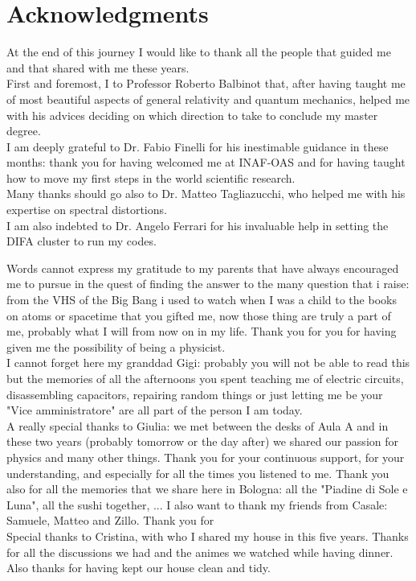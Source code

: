 \newpage
\section*{Acknowledgments}
At the end of this journey I would like to thank all the people that guided me and that shared with me these years.\\
First and foremost, I  to Professor Roberto Balbinot that, after having taught me of most beautiful aspects of general relativity and quantum mechanics, helped me with his advices deciding on which direction to take to conclude my master degree.\\
I am deeply grateful to Dr. Fabio Finelli for his inestimable guidance in these months: thank you for having welcomed me at INAF-OAS and for having taught how to move my first steps in the world scientific research.\\
Many thanks should go also to Dr. Matteo Tagliazucchi, who helped me with his expertise on spectral distortions.\\
I am also indebted to Dr. Angelo Ferrari for his invaluable help in setting the DIFA cluster to run my codes.

Words cannot express my gratitude to my parents that have always encouraged me to pursue in the quest of finding the answer to the many question that i raise: from the VHS of the Big Bang i used to watch when I was a child to the books on atoms or spacetime that you gifted me, now those thing are truly a part of me, probably what I will from now on in my life. Thank you for you for having given me the possibility of being a physicist.\\
I cannot forget here my granddad Gigi: probably you will not be able to read this but the memories of all the afternoons you spent teaching me of electric circuits, disassembling capacitors, repairing random things or just letting me be your "Vice amministratore" are all part of the person I am today.\\
A really special thanks to Giulia: we met between the desks of Aula A and in these two years (probably tomorrow or the day after) we shared our passion for physics and many other things. Thank you for your continuous support, for your understanding, and especially for all the times you listened to me. Thank you also for all the memories that we share here in Bologna: all the "Piadine di Sole e Luna", all the sushi together, ... 
I also want to thank my friends from Casale: Samuele, Matteo and Zillo. Thank you for \\
Special thanks to Cristina, with who I shared my house in this five years. Thanks for all the discussions we had and the animes we watched while having dinner. Also thanks for having kept our house clean and tidy. 

